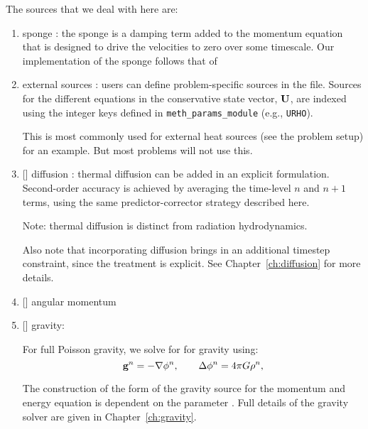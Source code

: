 \begin{enumerate}
  The sources that we deal with here are:
  \begin{enumerate}
  \item sponge : the sponge is a damping term added to
    the momentum equation that is designed to drive the velocities to
    zero over some timescale.  Our implementation of the sponge
    follows that of \maestro~\cite{maestro:III}

  \item external sources : users can define problem-specific sources
    in the  file.  Sources for the different
    equations in the conservative state vector, ${\bf U}$, are indexed
    using the integer keys defined in {\tt meth\_params\_module}
    (e.g., {\tt URHO}).

    This is most commonly used for external heat sources (see the
     problem setup) for an example.  But most
    problems will not use this.

  \item {[]} diffusion : thermal diffusion can be
    added in an explicit formulation.  Second-order accuracy is
    achieved by averaging the time-level $n$ and $n+1$ terms, using
    the same predictor-corrector strategy described here.

    Note: thermal diffusion is distinct from radiation hydrodynamics.

    Also note that incorporating diffusion brings in an additional
    timestep constraint, since the treatment is explicit.  See
    Chapter~\ref{ch:diffusion} for more details. 

  \item {[]} angular momentum 


  \item {[]} gravity:

    For full Poisson gravity, we solve for for gravity using:
    \begin{equation}
      {\bf g}^n = -\nabla\phi^n, \qquad
      \Delta\phi^n = 4\pi G\rho^n,
    \end{equation}

    The construction of the form of the gravity source for the
    momentum and energy equation is dependent on the parameter
    .  Full details of the gravity
    solver are given in Chapter~\ref{ch:gravity}.


\end{enumerate}
\end{enumerate}
